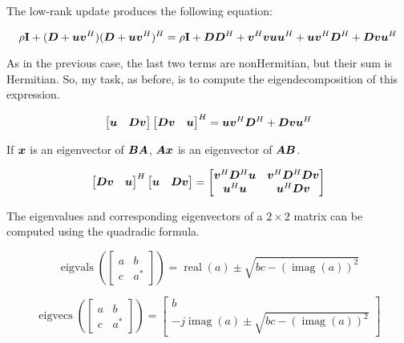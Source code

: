\documentclass{article}
\begin{document}
The low-rank update produces the following equation:

\begin{equation}
\rho{\bf I} + (\bm{D} + \bm{u}\bm{v}^H)(\bm{D} + \bm{u}\bm{v}^H)^H = \rho{\bf I} + \bm{D}\bm{D}^H + \bm{v}^H\bm{v} \bm{u}\bm{u}^H + \bm{u}\bm{v}^H\bm{D}^H + \bm{D}\bm{v}\bm{u}^H
\end{equation}

As in the previous case, the last two terms are nonHermitian, but their sum is Hermitian. So, my task, as before, is to compute the eigendecomposition of this expression.

\begin{equation}
\begin{bmatrix}
\bm{u} & \bm{D}\bm{v} 
\end{bmatrix}
\begin{bmatrix}
\bm{D}\bm{v} & \bm{u}
\end{bmatrix}^H = \bm{u}\bm{v}^H \bm{D}^H + \bm{D}\bm{v}\bm{u}^H
\end{equation}


If $\bm{x}$ is an eigenvector of $\bm{B}\bm{A}$, $\bm{A}\bm{x}$ is an eigenvector of $\bm{A}\bm{B}$.


\begin{equation}
\begin{bmatrix}
\bm{D}\bm{v} & \bm{u}
\end{bmatrix}^H
\begin{bmatrix}
\bm{u} & \bm{D}\bm{v} 
\end{bmatrix}
 = 
\begin{bmatrix}
\bm{v}^H\bm{D}^H\bm{u} & \bm{v}^H\bm{D}^H\bm{D}\bm{v} \\
\bm{u}^H\bm{u}    & \bm{u}^H\bm{D}\bm{v}
\end{bmatrix}
\end{equation}

The eigenvalues and corresponding eigenvectors of a $2 \times 2$ matrix can be computed using the quadradic formula.

\begin{equation}
\operatorname{eigvals}(\begin{bmatrix} a & b \\ c & a^* \end{bmatrix}) = \operatorname{real}(a) \pm \sqrt{bc - (\operatorname{imag}(a))^2}
\end{equation}

\begin{equation}
\operatorname{eigvecs}(\begin{bmatrix} a & b \\ c & a^* \end{bmatrix}) = \begin{bmatrix} b \\ -j\operatorname{imag}(a) \pm \sqrt{bc - (\operatorname{imag}(a))^2}\end{bmatrix}
\end{equation}
\end{document}
